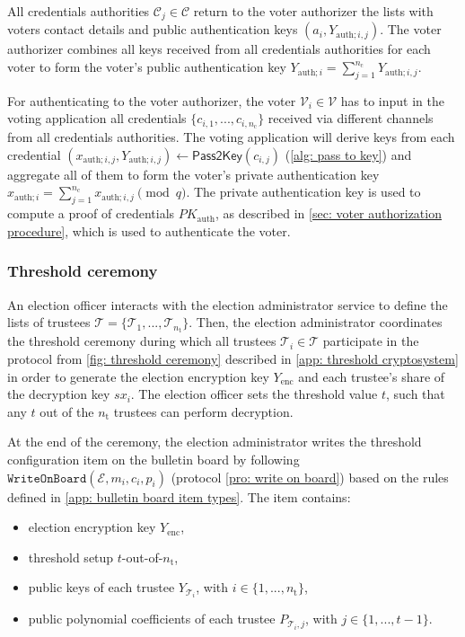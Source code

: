 All credentials authorities $\mathcal{C}_j \in \boldsymbol{\mathcal{C}}$ return to the voter authorizer the lists with voters contact details and public authentication keys $(a_i, Y_{\mathrm{auth}; i,j})$. The voter authorizer combines all keys received from all credentials authorities for each voter to form the voter's public authentication key $Y_{\mathrm{auth}; i} = \sum_{j=1}^{n_\mathrm{c}} Y_{\mathrm{auth}; i, j}$.

For authenticating to the voter authorizer, the voter $\mathcal{V}_i \in \boldsymbol{\mathcal{V}}$ has to input in the voting application all credentials $\{ c_{i, 1}, ..., c_{i, n_\mathrm{c}} \}$ received via different channels from all credentials authorities. The voting application will derive keys from each credential $(x_{\mathrm{auth}; i, j}, Y_{\mathrm{auth}; i, j}) \gets \mathsf{Pass2Key}(c_{i, j})$ (\cref{alg: pass to key}) and aggregate all of them to form the voter's private authentication key $x_{\mathrm{auth}; i} = \sum_{j=1}^{n_\mathrm{c}} x_{\mathrm{auth}; i, j} \pmod q$. The private authentication key is used to compute a proof of credentials $PK_\mathrm{auth}$, as described in \cref{sec: voter authorization procedure}, which is used to authenticate the voter.


\subsubsection{Threshold ceremony} \label{sec: threshold ceremony}
An election officer interacts with the election administrator service to define the lists of trustees $\boldsymbol{\mathcal{T}} = \{ \mathcal{T}_1, ..., \mathcal{T}_{n_\mathrm{t}} \}$. Then, the election administrator coordinates the threshold ceremony during which all trustees $\mathcal{T}_i \in \boldsymbol{\mathcal{T}}$ participate in the protocol from \cref{fig: threshold ceremony} described in \cref{app: threshold cryptosystem} in order to generate the election encryption key $Y_\mathrm{enc}$ and each trustee's share of the decryption key $sx_i$. The election officer sets the threshold value $t$, such that any $t$ out of the $n_\mathrm{t}$ trustees can perform decryption.

At the end of the ceremony, the election administrator writes the threshold configuration item on the bulletin board by following $\mathtt{WriteOnBoard}(\mathcal{E}, m_i, c_i, p_i)$ (protocol \ref{pro: write on board}) based on the rules defined in \cref{app: bulletin board item types}. The item contains:
\begin{itemize}
    \item election encryption key $Y_\mathrm{enc}$,
    \item threshold setup $t$-out-of-$n_\mathrm{t}$,
    \item public keys of each trustee $Y_{\mathcal{T}_i}$, with $i \in \{1, ..., n_\mathrm{t}\}$,
    \item public polynomial coefficients of each trustee $P_{\mathcal{T}_i,j}$, with $j \in \{1, ..., t-1 \}$.
\end{itemize}


